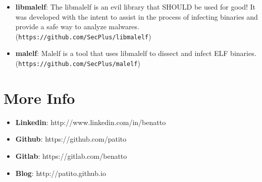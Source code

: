 \documentclass[margin]{res}
\begin{document}
\begin{resume}
\begin{itemize}
		    \item \textbf{libmalelf}: The libmalelf is an evil library that SHOULD be used for good! It was developed
		                              with the intent to assist in the process of infecting binaries and provide a safe 
		                              way to analyze malwares. (\texttt{https://github.com/SecPlus/libmalelf})\vspace{1mm}
		                              
		    \item \textbf{malelf}: Malelf is a tool that uses libmalelf to dissect and infect ELF binaries. 
		                           (\texttt{https://github.com/SecPlus/malelf})
		\end{itemize}
 
\section{More Info}
    \begin{itemize}
        \item \textbf{Linkedin}: http://www.linkedin.com/in/benatto
        \item \textbf{Github}: https://github.com/patito
        \item \textbf{Gitlab}: https://gitlab.com/benatto
        \item \textbf{Blog}: http://patito.github.io
    \end{itemize}


\end{resume} 
\end{document}
